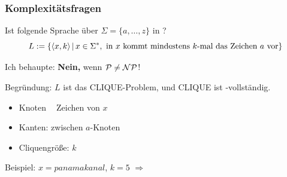 

\invincible

\begin{frame}
	\frametitle{Komplexitätsfragen}
	
	Ist folgende Sprache über $\Sigma = \{a, \ldots, z\}$ in \classP{}? $$L := \left\lbrace \left\langle x, k \right\rangle \,\middle\vert\, x \in \Sigma^*, \text{ in } x \text{ kommt mindestens } k \text{-mal das Zeichen } a \text { vor}  \right\rbrace$$
	
	\pause Ich behaupte: \textbf{Nein,} wenn $\mathcal{P} \neq \mathcal{NP}$!
	
	\pause Begründung: $L$ ist das CLIQUE-Problem, und CLIQUE ist \classNP{}-vollständig.
	
	\pause
	\begin{itemize}
		\item Knoten $\mathop{\hat{=}}$ Zeichen von $x$
		\item Kanten: zwischen $a$-Knoten
		\item Cliquengröße: $k$
	\end{itemize}
	
	\pause Beispiel: $x = panamakanal$, $k = 5$ $\Rightarrow$
	
	
\end{frame}

